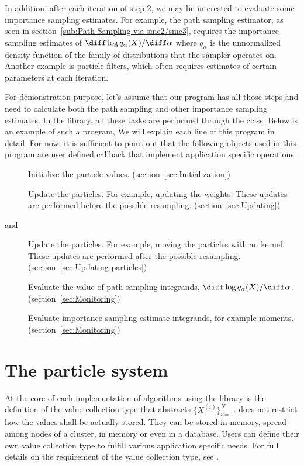 In addition, after each iteration of step 2, we may be interested to evaluate
some importance sampling estimates. For example, the path sampling estimator,
as seen in section~\ref{sub:Path Sampling via smc2/smc3}, requires the
importance sampling estimates of $\diff\log q_{\alpha}(X)/\diff\alpha$ where
$q_{\alpha}$ is the unnormalized density function of the family of
distributions that the \smc sampler operates on. Another example is particle
filters, which often requires estimates of certain parameters at each
iteration.

For demonstration purpose, let's assume that our program has all those steps
and need to calculate both the path sampling and other importance sampling
estimates. In the \vsmc library, all these tasks are performed through the
 class. Below is an example of such a program,
We will explain each line of this program in detail. For now, it is sufficient
to point out that the following objects used in this program are user defined
callback that implement application specific operations.
\begin{description}
  \item[] Initialize the particle values.
    (section~\ref{sec:Initialization})
  \item[] Update the particles. For example, updating the
    weights. These updates are performed before the possible resampling.
    (section~\ref{sec:Updating})
  \item[ and ] Update the particles. For
    example, moving the particles with an \mcmc kernel. These updates are
    performed after the possible resampling. (section~\ref{sec:Updating
      particles})
  \item[] Evaluate the value of path sampling integrands,
    $\diff\log q_{\alpha}(X)/\diff\alpha$. (section~\ref{sec:Monitoring})
  \item[] Evaluate importance sampling estimate
    integrands, for example moments. (section~\ref{sec:Monitoring})
\end{description}

\section{The particle system}
\label{sec:The particle system}

At the core of each implementation of \smc algorithms using the \vsmc library
is the definition of the value collection type that abstracts
$\{X^{(i)}\}_{i=1}^N$. \vsmc does not restrict how the values shall be
actually stored. They can be stored in memory, spread among nodes of a
cluster, in \gpu memory or even in a database. Users can define their own
value collection type to fulfill various application specific needs. For full
details on the requirement of the value collection type, see \cite{vsmcjss}.

